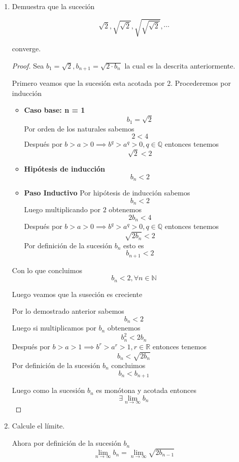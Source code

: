 \documentclass[letterpaper]{article}
\theoremstyle{definition}
\theoremstyle{lemathm}
\theoremstyle{lemademthm}
\newcommand{\R}{\mathbb{R}}
\begin{document}
\begin{enumerate}
\begin{enumerate}
\begin{proof}
			\end{proof}

			\item Demuestra que la suceción
			
			\[\sqrt{2},\sqrt{\sqrt{2}},\sqrt{\sqrt{\sqrt{2}}},\cdots\]

			converge.

			\begin{proof}
				Sea $b_1 = \sqrt{2}, b_{n+1}  =  \sqrt{2\cdot b_n}$ la cual es la descrita anteriormente.
    
				Primero veamos que la sucesión esta acotada por $2$. Procederemos por inducción
				
				\begin{itemize}
					\item \textbf{Caso base: n = 1}
					\[b_1 = \sqrt{2}\]
					Por orden de los naturales sabemos
					\[2 < 4\]
					Después por $b > a > 0 \implies b^q > a^q > 0, q \in \mathbb{Q}$ entonces tenemos
					\[\sqrt{2} < 2\]
					\item \textbf{Hipótesis de inducción}
					\[b_n < 2\]
					\item \textbf{Paso Inductivo}
					Por hipótesis de inducción sabemos
					\[b_n < 2\]
					Luego multiplicando por $2$ obtenemos
					\[2b_n < 4\]
					Después por $b > a > 0 \implies b^q > a^q > 0, q \in \mathbb{Q}$ entonces tenemos
					\[\sqrt{2b_n} < 2\]
					Por definición de la sucesión ${b_n}$ esto es
					\[b_{n+1} < 2\]
				\end{itemize}
				
				Con lo que concluimos
				\[b_n < 2, \forall n \in \mathbb{N}\]
				
				Luego veamos que la suseción es creciente
				
				Por lo demostrado anterior sabemos
				\[b_n < 2\]
				Luego si multiplicamos por $b_n$ obtenemos
				\[b_n^2 < 2b_n\]
				Después por $b > a > 1 \implies b^r > a^r > 1, r \in \R$ entonces tenemos
				\[b_n < \sqrt{2b_n}\]
				Por definición de la sucesión ${b_n}$ concluimos
				\[b_n < b_{n+1}\]
				
				Luego como la sucesión ${b_n}$ es monótona y acotada entonces
				\[\exists \lim_{n\to\infty} b_n\]

			\end{proof}

			\item Calcule el límite. 
				
				Ahora por definición de la sucesión ${b_n}$
				\[\lim_{n\to\infty} b_n = \lim_{n\to\infty} \sqrt{2b_{n-1}}\]
				

\end{enumerate}
\end{enumerate}
\end{document}

